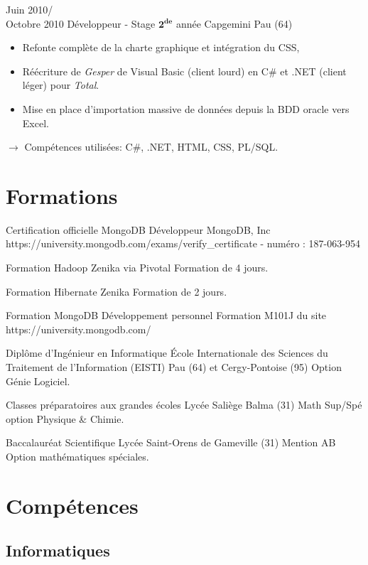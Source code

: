 \documentclass[11pt,a4paper]{moderncv}
\begin{document}
\cventry
{Juin 2010/\\Octobre 2010}
{Développeur - Stage $\mathbf{2^{de}}$ année}
{Capgemini}
{Pau (64)}
{}
{\begin{itemize}
\item Refonte complète de la charte graphique et intégration du CSS,
\item Réécriture de \emph{Gesper} de Visual Basic (client lourd) en C\# et .NET (client léger) pour \emph{Total}.
\item Mise en place d'importation massive de données depuis la BDD oracle vers Excel.
\end{itemize}
$\rightarrow$ Compétences utilisées: C\#, .NET, HTML, CSS, PL/SQL.
}   %


\section{Formations}

{Certification officielle MongoDB Développeur}
{MongoDB, Inc}
{}
{}
{https://university.mongodb.com/exams/verify\_certificate - numéro : 187-063-954}

{Formation Hadoop}
{Zenika via Pivotal}
{}
{}
{Formation de 4 jours.}

{Formation Hibernate}
{Zenika}
{}
{}
{Formation de 2 jours.}

{Formation MongoDB}
{Développement personnel}
{}
{}
{Formation M101J du site https://university.mongodb.com/}

{Diplôme d'Ingénieur en Informatique}
{\'Ecole Internationale des Sciences du Traitement de l’Information (EISTI)}
{Pau (64) et Cergy-Pontoise (95)}
{}
{Option Génie Logiciel.}

{Classes préparatoires aux grandes écoles}
{Lycée Saliège}
{Balma (31)}
{}
{Math Sup/Spé option Physique \& Chimie.}

{Baccalauréat Scientifique}
{Lycée}
{Saint-Orens de Gameville (31)}
{Mention AB}
{Option mathématiques spéciales.}

\section{Compétences}

\subsection{Informatiques}
\end{document}
